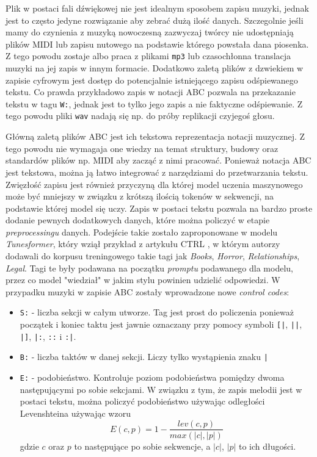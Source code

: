 \documentclass[data-science]{agh-wi} %
\begin{document}
Plik w postaci fali dźwiękowej nie jest idealnym sposobem zapisu muzyki, jednak jest to często jedyne rozwiązanie aby zebrać dużą ilość danych. Szczegolnie jeśli mamy do czynienia z muzyką nowoczesną zazwyczaj twórcy nie udostępniają plików MIDI lub zapisu nutowego na podstawie którego powstała dana piosenka. Z tego powodu zostaje albo praca z plikami \texttt{mp3} lub czasochłonna translacja muzyki na jej zapis w innym formacie. Dodatkowo zaletą plików z dzwiekiem w zapisie cyfrowym jest dostęp do potencjalnie istniejącego zapisu odśpiewanego tekstu. Co prawda przykładowo zapis w notacji ABC pozwala na przekazanie tekstu w tagu \texttt{W:}, jednak jest to tylko jego zapis a nie faktyczne odśpiewanie. Z tego powodu pliki \texttt{wav} nadają się np. do próby replikacji czyjegoś głosu.

Główną zaletą plików ABC jest ich tekstowa reprezentacja notacji muzycznej. Z tego powodu nie wymagaja one wiedzy na temat struktury, budowy oraz standardów plików np. MIDI aby zacząć z nimi pracować. Ponieważ notacja ABC jest tekstowa, można ją łatwo integrować z narzędziami do przetwarzania tekstu. Zwięzłość zapisu jest również przyczyną dla której model uczenia maszynowego może być mniejszy w związku z krótszą ilością tokenów w sekwencji, na podstawie której model się uczy. Zapis w postaci tekstu pozwala na bardzo proste dodanie pewnych dodatkowych danych, które można policzyć w etapie \textit{preprocessingu} danych. Podejście takie zostało zaproponowane w modelu \textit{Tunesformer}\cite{tunesformer}, który wziął przykład z artykułu CTRL \cite{keskarCTRL2019}, w którym autorzy dodawali do korpusu treningowego takie tagi jak \textit{Books}, \textit{Horror}, \textit{Relationships}, \textit{Legal}. Tagi te były podawana na początku \textit{promptu} podawanego dla modelu, przez co model "wiedział" w jakim stylu powinien udzielić odpowiedzi. W przypadku muzyki w zapisie ABC zostały wprowadzone nowe \textit{control codes}:
\begin{itemize}
    \item \texttt{S:} - liczba sekcji w całym utworze. Tag jest prost do policzenia ponieważ początek i koniec taktu jest jawnie oznaczany przy pomocy symboli \texttt{[|}, \texttt{||}, \texttt{|]}, \texttt{|:}, \texttt{::} i \texttt{:|}.
    \item \texttt{B:} - liczba taktów w danej sekcji. Liczy tylko wystąpienia znaku \texttt{|}
    \item \texttt{E:} - podobieństwo. Kontroluje poziom podobieństwa pomiędzy dwoma następującymi po sobie sekcjami. W związku z tym, że zapis melodii jest w postaci tekstu, można policzyć podobieństwo używając odległości Levenshteina używając wzoru
          \begin{equation}
              E(c,p) = 1 - \dfrac{lev(c, p)}{max(|c|, |p|)}
          \end{equation}
          gdzie $c$ oraz $p$ to następujące po sobie sekwencje, a $|c|$, $|p|$ to ich długości.
\end{itemize}
\end{document}
